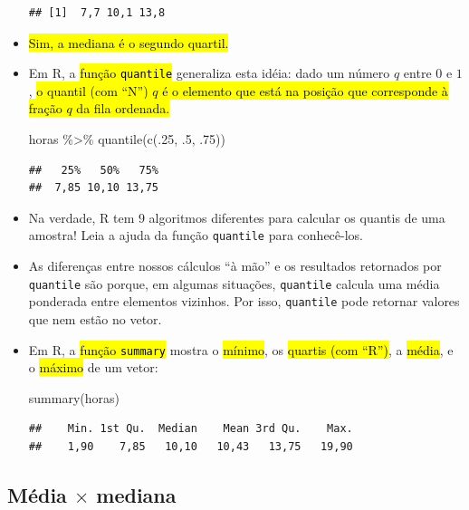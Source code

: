 \documentclass[
  11pt]{report}
\newenvironment{Shaded}{\begin{snugshade}}{\end{snugshade}}
\newcommand{\DecValTok}[1]{\textcolor[rgb]{0.00,0.00,0.81}{#1}}
\newcommand{\FunctionTok}[1]{\textcolor[rgb]{0.00,0.00,0.00}{#1}}
\newcommand{\NormalTok}[1]{#1}
\newcommand{\SpecialCharTok}[1]{\textcolor[rgb]{0.00,0.00,0.00}{#1}}
\renewenvironment{Shaded}{
    \begin{mdframed}[%
      roundcorner=2pt,%
      innerleftmargin=5pt,%
      innerrightmargin=5pt,%
      topline=true,%
      leftline=true,%
      rightline=true,%
      bottomline=true,%
      linewidth=0.5pt,%
      linecolor=black!20,%
      backgroundcolor=black!2,%
      skipabove=2ex,%
      skipbelow=2.5ex%
    ]%
  }
  {
    \end{mdframed}
  }
\begin{document}
\begin{itemize}
\begin{verbatim}
## [1]  7,7 10,1 13,8
\end{verbatim}
\item
  {\hl{Sim, a mediana é o segundo quartil.}}
\item
  Em R, a {\hl{função {\mbox{\texttt{quantile}}}}} generaliza esta idéia: dado um número $q$ entre $0$ e $1$, {\hl{o quantil (com ``N'') $q$ é o elemento que está na posição que corresponde à fração $q$ da fila ordenada.}}

\begin{Shaded}
\begin{Highlighting}[]
\NormalTok{horas }\SpecialCharTok{\%\textgreater{}\%} \FunctionTok{quantile}\NormalTok{(}\FunctionTok{c}\NormalTok{(.}\DecValTok{25}\NormalTok{, .}\DecValTok{5}\NormalTok{, .}\DecValTok{75}\NormalTok{))}
\end{Highlighting}
\end{Shaded}

\begin{verbatim}
##   25%   50%   75% 
##  7,85 10,10 13,75
\end{verbatim}
\item
  Na verdade, R tem $9$ algoritmos diferentes para calcular os quantis de uma amostra! Leia a ajuda da função \texttt{quantile} para conhecê-los.
\item
  As diferenças entre nossos cálculos ``à mão'' e os resultados retornados por \texttt{quantile} são porque, em algumas situações, \texttt{quantile} calcula uma média ponderada entre elementos vizinhos. Por isso, \texttt{quantile} pode retornar valores que nem estão no vetor.
\item
  Em R, a {\hl{função {\mbox{\texttt{summary}}}}} mostra o {\hl{mínimo}}, os {\hl{quartis (com ``R'')}}, a {\hl{média}}, e o {\hl{máximo}} de um vetor:

\begin{Shaded}
\begin{Highlighting}[]
\FunctionTok{summary}\NormalTok{(horas)}
\end{Highlighting}
\end{Shaded}

\begin{verbatim}
##    Min. 1st Qu.  Median    Mean 3rd Qu.    Max. 
##    1,90    7,85   10,10   10,43   13,75   19,90
\end{verbatim}
\end{itemize}

\hypertarget{muxe9dia-times-mediana}{%
\subsection{\texorpdfstring{Média $\times$ mediana}{Média  mediana}}\label{muxe9dia-times-mediana}}
\end{document}
